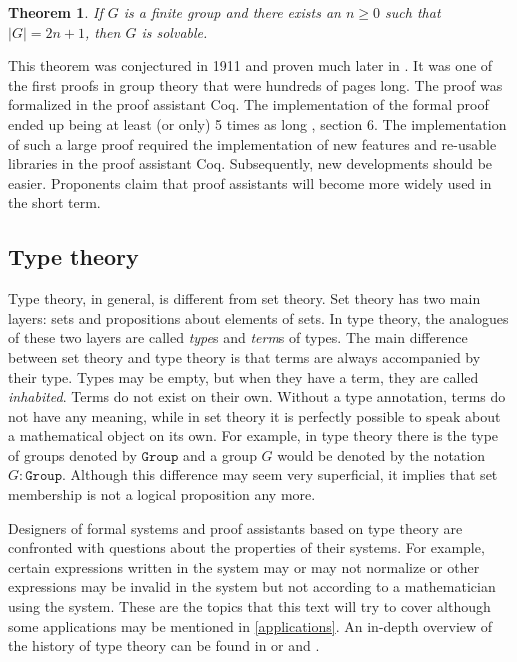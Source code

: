 \documentclass[12pt,a4paper,twoside,xetex]{book}
\newcommand{\keyword}[1]{\emph{#1}\index{#1}}
\newtheorem{theorem}{Theorem}[section]
\newcommand{\op}[1]{\mathtt{#1}}
\begin{document}
\begin{theorem}
If $G$ is a finite group and there exists an $n \geq 0$ such that $|G| = 2n+1$, then $G$ is solvable.
\end{theorem}

This theorem was conjectured in 1911 and proven much later in \cite{Feit1963}. It was one of the first proofs in group theory that were hundreds of pages long. The proof was formalized in the proof assistant Coq. The implementation of the formal proof ended up being at least (or only) 5 times as long \cite{Gonthier2013}, section 6. The implementation of such a large proof required the implementation of new features and re-usable libraries in the proof assistant Coq. Subsequently, new developments should be easier. Proponents claim that proof assistants will become more widely used in the short term.






\subsection{Type theory}

Type theory, in general, is different from set theory. Set theory has two main layers: sets and propositions about elements of sets. In type theory, the analogues of these two layers are called \keyword{type}s and \keyword{term}s of types. The main difference between set theory and type theory is that terms are always accompanied by their type. Types may be empty, but when they have a term, they are called \keyword{inhabited}. Terms do not exist on their own. Without a type annotation, terms do not have any meaning, while in set theory it is perfectly possible to speak about a mathematical object on its own. For example, in type theory there is the type of groups denoted by $\op{Group}$ and a group $G$ would be denoted by the notation $G : \op{Group}$. Although this difference may seem very superficial, it implies that set membership is not a logical proposition any more. 

Designers of formal systems and proof assistants based on type theory are confronted with questions about the properties of their systems. For example, certain expressions written in the system may or may not normalize or other expressions may be invalid in the system but not according to a mathematician using the system. These are the topics that this text will try to cover although some applications may be mentioned in \cref{applications}. An in-depth overview of the history of type theory can be found in \cite{Coquand2013oct} or \cite{Constable2011} and \cite{Constable2015July}.
\end{document}
